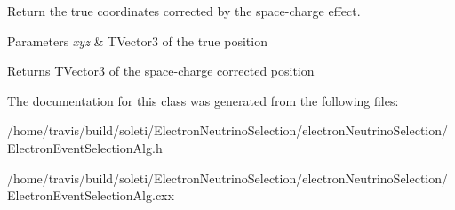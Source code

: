 Return the true coordinates corrected by the space-\/charge effect. 


\begin{DoxyParams}{Parameters}
{\em xyz} & T\-Vector3 of the true position \\
\hline
\end{DoxyParams}
\begin{DoxyReturn}{Returns}
T\-Vector3 of the space-\/charge corrected position 
\end{DoxyReturn}


The documentation for this class was generated from the following files\-:\begin{DoxyCompactItemize}
\item 
/home/travis/build/soleti/\-Electron\-Neutrino\-Selection/electron\-Neutrino\-Selection/Electron\-Event\-Selection\-Alg.\-h\item 
/home/travis/build/soleti/\-Electron\-Neutrino\-Selection/electron\-Neutrino\-Selection/Electron\-Event\-Selection\-Alg.\-cxx\end{DoxyCompactItemize}
